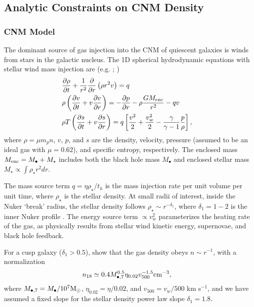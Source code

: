 \documentclass[usenatbib,fleqn]{mnras}
\newcommand{\Mbh}[1][]{M_{\bullet#1}}
\newcommand{\Menc}{M_{\rm enc}}
\renewcommand{\th}{t_h}
\newcommand{\Msun}{{\rm M_\odot}}
\begin{document}
\subsection{Analytic Constraints on CNM Density}

\subsubsection{CNM Model}
\label{sec:model}

The dominant source of gas injection into the CNM of quiescent
galaxies is winds from stars in the galactic nucleus. The 1D spherical
hydrodynamic equations with stellar wind mass injection are
(e.g. \citealt{Holzer+1970}; \citealt{Quataert2004}) 
\begin{align}
  &\frac{\partial \rho}{\partial t}+\frac{1}{r^2}\frac{\partial}{\partial r}\left(\rho r^2 v\right)=q \label{eq:drhodt}\\
  &\rho \left(\frac{\partial v}{\partial t} + v\frac{\partial
      v}{\partial r}\right) =-\frac{\partial p}{\partial r}- \rho\frac{GM_{\rm enc}}{r^{2}} -q v \label{eq:dvdt}\\
  &\rho T\left(\frac{\partial s}{\partial t} + v\frac{\partial
      s}{\partial
      r}\right)=q\left[\frac{v^2}{2}+\frac{v_w^2}{2}-\frac{\gamma}{\gamma-1}
    \frac{p}{\rho} \right] ,
\label{eq:dsdt}
\end{align}
where $\rho = \mu m_p n$, $v$, $p$, and $s$ are the density, velocity,
pressure (assumed to be an ideal gas with $\mu = 0.62$), and specific
entropy, respectively.  The enclosed mass $\Menc = M_{\bullet} +
M_{\star}$ includes both the black hole mass $M_{\bullet}$ and
enclosed stellar mass $M_{\star} \propto \int \rho_{\star}r^{2}dr$.

The mass source term $q =\eta \rho_\star/\th$ is the mass injection
rate per unit volume per unit time, where $\rho_\star$ is the stellar
density.  At small radii of interest, inside the Nuker `break' radius,
the stellar density follows $\rho_\star\sim r^{-\delta_1}$, where
$\delta_1 = 1-2$ is the inner Nuker profile \citep{Lauer+2007}.  The
energy source term $\propto v_w^{2}$ parameterizes the heating rate of
the gas, as physically results from stellar wind kinetic energy,
supernovae, and black hole feedback.

For a cusp galaxy ($\delta_1> 0.5$), \citet{Generozov+2015} show that the gas density obeys $n \sim
r^{-1}$, with a normalization
\begin{equation}
n_{18}\simeq 0.4 \Mbh[,7]^{0.5} \eta_{0.02} v_{500}^{-1.5} {\rm
  cm^{-3}},
\label{eq:n18}
\end{equation}
where $\Mbh[,7]= \Mbh/10^7 \Msun$,
$\eta_{0.02}= \eta/0.02$, and $v_{500}=v_w/500$ km s$^{-1}$, and we have assumed a fixed slope for the stellar density
power law slope $\delta_1=1.8$. 
\end{document}
